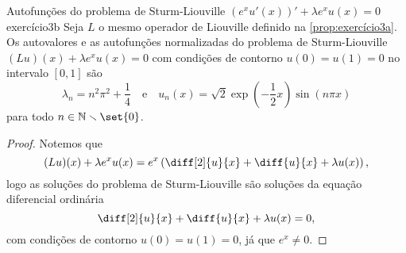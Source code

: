 \begin{proposition}{Autofunções do problema de Sturm-Liouville \((e^xu'(x))' + \lambda e^x u(x) = 0\)}{exercício3b}
    Seja \(L\) o mesmo operador de Liouville definido na \cref{prop:exercício3a}. Os autovalores e as autofunções normalizadas do problema de Sturm-Liouville \((Lu)(x) + \lambda e^x u(x) = 0\) com condições de contorno \(u(0) = u(1) = 0\) no intervalo \([0,1]\) são
    \begin{equation*}
        \lambda_n = n^2 \pi^2 + \frac14
        \quad\text{e}\quad
        u_n(x) = \sqrt{2} \exp\left(-\frac{1}{2}x\right)\sin(n\pi x)
    \end{equation*}
    para todo \(n \in \mathbb{N}\smallsetminus\set{0}\).
\end{proposition}
\begin{proof}
    Notemos que
    \begin{equation*}
        (Lu)(x) + \lambda e^{x} u(x) = e^x \left(\diff[2]{u}{x} + \diff{u}{x} + \lambda u(x)\right),
    \end{equation*}
    logo as soluções do problema de Sturm-Liouville são soluções da equação diferencial ordinária
    \begin{equation*}
        \diff[2]{u}{x} + \diff{u}{x} + \lambda u(x) = 0,
    \end{equation*}
    com condições de contorno \(u(0) = u(1) = 0\), já que \(e^x \neq 0\).


\end{proof}
